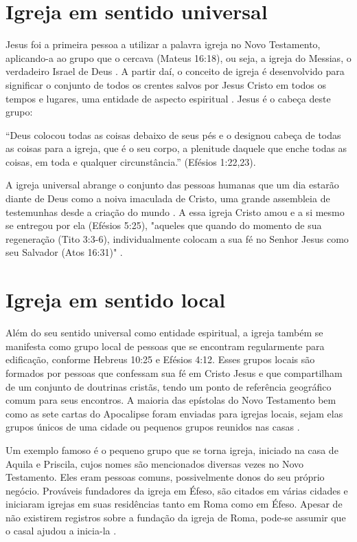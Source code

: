 \documentclass[12pt,openright,oneside,a4paper]{abntex2}
\begin{document}
\section{Igreja em sentido universal}

Jesus foi a primeira pessoa a utilizar a palavra igreja no Novo Testamento, aplicando-a ao grupo que o cercava (Mateus 16:18), ou seja, a igreja do Messias, o verdadeiro Israel de Deus \cite[p. 911]{berkhof}. A partir daí, o conceito de igreja é desenvolvido para significar o conjunto de todos os crentes salvos por Jesus Cristo em todos os tempos e lugares, uma entidade de aspecto espiritual \cite[p. 318]{zac}. Jesus é o cabeça deste grupo:

\begin{citacao}“Deus colocou todas as coisas debaixo de seus pés e o designou cabeça de todas as coisas para a igreja, que é o seu \cite[p.43]{zac} corpo, a plenitude daquele que enche todas as coisas, em toda e qualquer circunstância.” (Efésios 1:22,23).
\end{citacao}

A igreja universal abrange o conjunto das pessoas humanas que um dia estarão diante de Deus como a noiva imaculada de Cristo, uma grande assembleia de testemunhas desde a criação do mundo \cite[p. 607]{bavinck}. A essa igreja Cristo amou e a si mesmo se entregou por ela (Efésios 5:25), "aqueles que quando do momento de sua regeneração (Tito 3:3-6), individualmente colocam a sua fé no Senhor Jesus como seu Salvador (Atos 16:31)" \cite[p. 319]{zac}.

\section{Igreja em sentido local}

Além do seu sentido universal como entidade espiritual, a igreja também se manifesta como grupo local de pessoas que se encontram regularmente para edificação, conforme Hebreus 10:25 e Efésios 4:12. Esses grupos locais são formados por pessoas que confessam sua fé em Cristo Jesus e que compartilham de um conjunto de doutrinas cristãs, tendo um ponto de referência geográfico comum para seus encontros. A maioria das epístolas do Novo Testamento bem como as sete cartas do Apocalipse foram enviadas para igrejas locais, sejam elas grupos únicos de uma cidade ou pequenos grupos reunidos nas casas \cite[p. 320]{zac}. 

Um exemplo famoso é o pequeno grupo que se torna igreja, iniciado na casa de Aquila e Priscila, cujos nomes são mencionados diversas vezes no Novo Testamento. Eles eram pessoas comuns, possivelmente donos do seu próprio negócio. Prováveis fundadores da igreja em Éfeso, são citados em várias cidades e iniciaram igrejas em suas residências tanto em Roma como em Éfeso. Apesar de não existirem registros sobre a fundação da igreja de Roma, pode-se assumir que o casal ajudou a inicia-la \cite[p. 54]{stetzer}.
\end{document}
